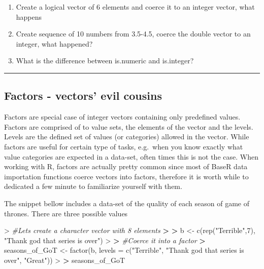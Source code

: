\documentclass[
]{book}
\newenvironment{Shaded}{\begin{snugshade}}{\end{snugshade}}
\newcommand{\AttributeTok}[1]{\textcolor[rgb]{0.77,0.63,0.00}{#1}}
\newcommand{\CommentTok}[1]{\textcolor[rgb]{0.56,0.35,0.01}{\textit{#1}}}
\newcommand{\DecValTok}[1]{\textcolor[rgb]{0.00,0.00,0.81}{#1}}
\newcommand{\ErrorTok}[1]{\textcolor[rgb]{0.64,0.00,0.00}{\textbf{#1}}}
\newcommand{\FunctionTok}[1]{\textcolor[rgb]{0.00,0.00,0.00}{#1}}
\newcommand{\NormalTok}[1]{#1}
\newcommand{\OtherTok}[1]{\textcolor[rgb]{0.56,0.35,0.01}{#1}}
\newcommand{\SpecialCharTok}[1]{\textcolor[rgb]{0.00,0.00,0.00}{#1}}
\newcommand{\StringTok}[1]{\textcolor[rgb]{0.31,0.60,0.02}{#1}}
\theoremstyle{definition}
\theoremstyle{definition}
\theoremstyle{definition}
\theoremstyle{definition}
\theoremstyle{remark}
\begin{document}
\begin{enumerate}
\def\labelenumi{\arabic{enumi}.}
\setcounter{enumi}{1}
\item
  Create a logical vector of 6 elements and coerce it to an integer vector, what happens
\item
  Create sequence of 10 numbers from 3.5-4.5, coerce the double vector to an integer, what happened?
\item
  What is the difference between is.numeric and is.integer?
\end{enumerate}

\begin{center}\rule{0.5\linewidth}{0.5pt}\end{center}

\hypertarget{factors---vectors-evil-cousins}{%
\subsection*{\texorpdfstring{\textbf{Factors - vectors' evil cousins}}{Factors - vectors' evil cousins}}\label{factors---vectors-evil-cousins}}

Factors are special case of integer vectors containing only predefined values. Factors are comprised of to value sets, the
elements of the vector and the levels. Levels are the defined set of values (or categories) allowed in the vector.
While factors are useful for certain type of tasks, e.g.~when you know exactly what value categories are expected in a
data-set, often times this is not the case. When working with R, factors are actually pretty common since most of
BaseR data importation functions coerce vectors into factors, therefore it is worth while to dedicated a few minute
to familiarize yourself with them.

The snippet bellow includes a data-set of the quality of each season of game of thrones. There are three possible values

\begin{Shaded}
\begin{Highlighting}[]
\SpecialCharTok{\textgreater{}} \CommentTok{\#Let\textquotesingle{}s create a character vector with 8 elements}
\ErrorTok{\textgreater{}} 
\ErrorTok{\textgreater{}}\NormalTok{ b }\OtherTok{\textless{}{-}} \FunctionTok{c}\NormalTok{(}\FunctionTok{rep}\NormalTok{(}\StringTok{"Terrible"}\NormalTok{,}\DecValTok{7}\NormalTok{), }\StringTok{"Thank god that series is over"}\NormalTok{)}
\SpecialCharTok{\textgreater{}} 
\ErrorTok{\textgreater{}} \CommentTok{\#Coerce it into a factor}
\ErrorTok{\textgreater{}}\NormalTok{ seasons\_of\_GoT }\OtherTok{\textless{}{-}} \FunctionTok{factor}\NormalTok{(b, }\AttributeTok{levels =} \FunctionTok{c}\NormalTok{(}\StringTok{"Terrible"}\NormalTok{, }\StringTok{"Thank god that series is over"}\NormalTok{, }\StringTok{"Great"}\NormalTok{))}
\SpecialCharTok{\textgreater{}} 
\ErrorTok{\textgreater{}}\NormalTok{ seasons\_of\_GoT}
\end{Highlighting}
\end{Shaded}
\end{document}
